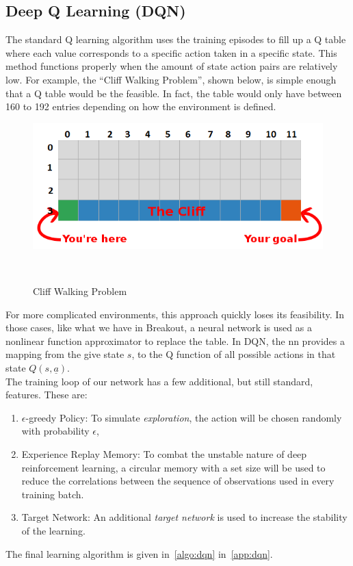 \subsection{Deep Q Learning (DQN)}
The standard Q learning algorithm uses the training episodes to fill up a Q table where
each value corresponds to a specific action taken in a specific state. This method
functions properly when the amount of state action pairs are relatively low.
For example, the ``Cliff Walking Problem'', shown below, is simple enough that a Q table would be the feasible. In fact, the table would only have between 160 to 192 entries depending on  how the environment is defined.

\begin{figure}[h]
    \centering{}
    \includegraphics[width=\linewidth, height=0.3\textheight, keepaspectratio]{img/cliff_walking.png}
    \caption{Cliff Walking Problem~\autocite{Cliff_photo}}~\label{fig:CliffWalk}
\end{figure}


For more complicated environments, this approach quickly loses its feasibility.
In those cases, like what we have in Breakout, a neural network is used as a
nonlinear function approximator to replace the table. In DQN, the nn provides a
mapping from the give state \(s\), to the Q function of all possible actions in that
state \(Q(s,\underline{a})\).\\
The training loop of our network has a few additional, but still standard, features.
These are:
\begin{enumerate}
    \item
          \(\epsilon \)-greedy Policy: To simulate \textit{exploration}, the action will be chosen randomly with probability \(\epsilon \),
    \item Experience Replay Memory: To combat the unstable nature of deep reinforcement
          learning, a circular memory with a set size will be used to reduce the correlations
          between the sequence of observations used in every training batch.
    \item Target Network: An additional \textit{target network} is used to increase the
          stability of the learning.
\end{enumerate}
The final learning algorithm is given in~\autoref{algo:dqn} in~\autoref{app:dqn}.
